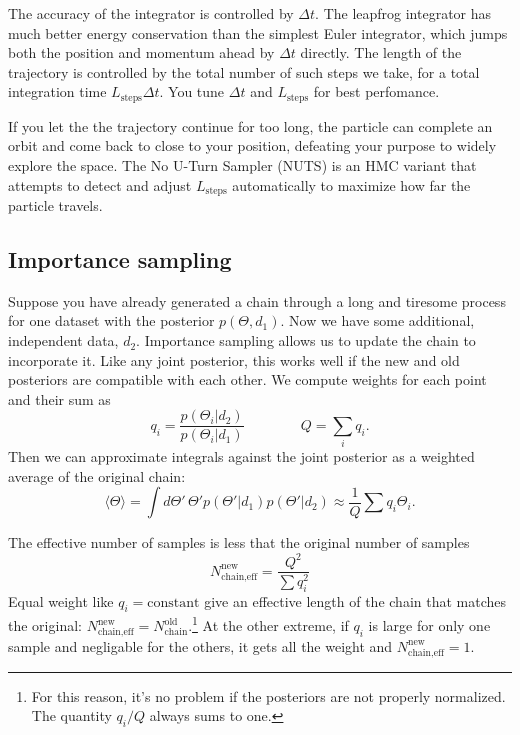 The accuracy of the integrator is controlled by $\Delta t$.  The leapfrog integrator has much better energy conservation than the simplest Euler integrator, which jumps both the position and momentum ahead by $\Delta t$ directly.  The length of the trajectory is controlled by the total number of such steps we take, for a total integration time $L_\textrm{steps} \Delta t$. You tune $\Delta t$ and $L_\textrm{steps}$ for best perfomance.

If you let the the trajectory continue for too long, the particle can complete an orbit and come back to close to your position, defeating your purpose to widely explore the space.  The No U-Turn Sampler (NUTS) is an HMC variant that attempts to detect and adjust $L_\textrm{steps}$ automatically to maximize how far the particle travels.

\subsection{Importance sampling} \label{sec:importance_sampling} 
Suppose you have already generated a chain through a long and tiresome process for one dataset with the posterior $p(\Theta,d_1)$.  Now we have some additional, independent data, $d_2$.  Importance sampling allows us to update the chain to incorporate it.  Like any joint posterior, this works well if the new and old posteriors are compatible with each other.  We compute weights for each point and their sum as
\begin{equation}
  q_i = \frac{p(\Theta_i|d_2)}{p(\Theta_i|d_1)}
\qquad \mbox{} \qquad
  Q = \sum_i q_i.
\end{equation}
Then we can approximate integrals against the joint posterior as a weighted average of the original chain:
\begin{equation}
  \langle \Theta \rangle = \int d\Theta'\, \Theta' p(\Theta'|d_1) p(\Theta'|d_2) \approx \frac{1}{Q} \sum q_i \Theta_i.
\end{equation}

The effective number of samples is less that the original number of samples
\begin{equation}
  N^\textrm{new}_\textrm{chain,eff} = \frac{Q^2}{\sum q_i^2}
\end{equation}
Equal weight like $q_i = \mbox{constant}$ give an effective length of the chain that matches the original:  $N^\textrm{new}_\textrm{chain,eff} = N^\textrm{old}_\textrm{chain}$.\footnote{For this reason, it's no problem if the posteriors are not properly normalized.  The quantity $q_i/Q$ always sums to one.}  At the other extreme, if $q_i$ is large for only one sample and negligable for the others, it gets all the weight and $N^\textrm{new}_\textrm{chain,eff} = 1$.

